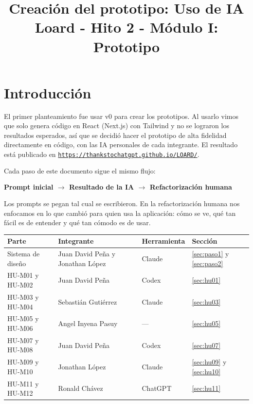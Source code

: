 \documentclass[11pt]{article}
\title{Creación del prototipo: Uso de IA\\[0.3em]
\large Loard - Hito 2 - Módulo I: Prototipo}
\author{}
\date{}
\newcommand{\urlapp}{https://thankstochatgpt.github.io/LOARD}
\begin{document}
\maketitle

\section{Introducción}

El primer planteamiento fue usar v0 para crear los prototipos. Al usarlo vimos que solo genera código en React (Next.js) con Tailwind y no se lograron los resultados esperados, así que se decidió hacer el prototipo de alta fidelidad directamente en código, con las IA personales de cada integrante. El resultado está publicado en \href{\urlapp/}{\nolinkurl{https://thankstochatgpt.github.io/LOARD/}}.

Cada paso de este documento sigue el mismo flujo:

\begin{center}
\textbf{Prompt inicial $\rightarrow$ Resultado de la IA $\rightarrow$ Refactorización humana}
\end{center}

Los prompts se pegan tal cual se escribieron. En la refactorización humana nos enfocamos en lo que cambió para quien usa la aplicación: cómo se ve, qué tan fácil es de entender y qué tan cómodo es de usar.

\begin{center}
\begin{tabular}{>{\raggedright\arraybackslash}p{4.4cm} >{\raggedright\arraybackslash}p{3.8cm} >{\raggedright\arraybackslash}p{3.2cm} >{\raggedright\arraybackslash}p{3.4cm}}
\toprule
\textbf{Parte} & \textbf{Integrante} & \textbf{Herramienta} & \textbf{Sección} \\ \midrule
Sistema de diseño & Juan David Peña y Jonathan López & Claude & \ref{sec:paso1} y \ref{sec:paso2} \\
HU-M01 y HU-M02 & Juan David Peña & Codex & \ref{sec:hu01} \\
HU-M03 y HU-M04 & Sebastián Gutiérrez & Claude & \ref{sec:hu03} \\
HU-M05 y HU-M06 & Angel Inyena Pasuy & --- & \ref{sec:hu05} \\
HU-M07 y HU-M08 & Juan David Peña & Codex & \ref{sec:hu07} \\
HU-M09 y HU-M10 & Jonathan López & Claude & \ref{sec:hu09} y \ref{sec:hu10} \\
HU-M11 y HU-M12 & Ronald Chávez & ChatGPT & \ref{sec:hu11} \\
\bottomrule
\end{tabular}
\end{center}
\end{document}
